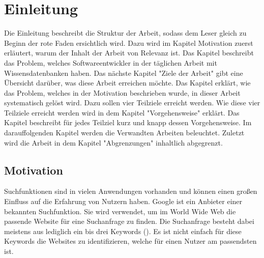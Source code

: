 \chapter{Einleitung}
\label{chap:intro}

Die Einleitung beschreibt die Struktur der Arbeit, sodass dem Leser gleich zu Beginn der rote Faden ersichtlich wird.
Dazu wird im Kapitel Motivation zuerst erläutert, warum der Inhalt der Arbeit von Relevanz ist.
Das Kapitel beschreibt das Problem, welches Softwareentwickler in der täglichen Arbeit mit Wissensdatenbanken haben.
Das nächste Kapitel "Ziele der Arbeit" gibt eine Übersicht darüber, was diese Arbeit erreichen möchte.
Das Kapitel erklärt, wie das Problem, welches in der Motivation beschrieben wurde, in dieser Arbeit systematisch gelöst wird.
Dazu sollen vier Teilziele erreicht werden.
Wie diese vier Teilziele erreicht werden wird in dem Kapitel "Vorgehensweise" erklärt.
Das Kapitel beschreibt für jedes Teilziel kurz und knapp dessen Vorgehensweise.
Im darauffolgenden Kapitel werden die Verwandten Arbeiten beleuchtet.
Zuletzt wird die Arbeit in dem Kapitel "Abgrenzungen" inhaltlich abgegrenzt.

\section{Motivation}
Suchfunktionen sind in vielen Anwendungen vorhanden und können einen großen Einfluss auf die Erfahrung von Nutzern haben.
Google ist ein Anbieter einer bekannten Suchfunktion.
Sie wird verwendet, um im World Wide Web die passende Website für eine Suchanfrage zu finden.
Die Suchanfrage besteht dabei meistens aus lediglich ein bis drei Keywords (\citeauthor[S. 18]{Sirotkin_2012}).
Es ist nicht einfach für diese Keywords die Websites zu identifizieren, welche für einen Nutzer am passendsten ist.\\

